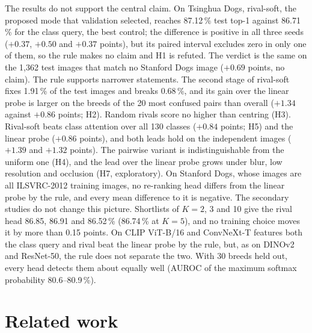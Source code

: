 \documentclass[11pt,a4paper]{article}
\theoremstyle{plain}
\begin{document}
The results do not support the central claim. On Tsinghua Dogs, rival-soft, the proposed mode that validation
selected, reaches 87.12\,\% test top-1 against 86.71\,\% for the class query, the best control; the difference is
positive in all three seeds ($+0.37$, $+0.50$ and $+0.37$ points), but its paired interval excludes zero in only
one of them, so the rule makes no claim and H1 is refuted. The verdict is the same on the 1,362 test images that
match no Stanford Dogs image ($+0.69$ points, no claim). The rule supports narrower statements. The second stage of
rival-soft fixes 1.91\,\% of the test images and breaks 0.68\,\%, and its gain over the linear probe is larger on
the breeds of the 20 most confused pairs than overall ($+1.34$ against $+0.86$ points; H2). Random rivals score no
higher than centring (H3). Rival-soft beats class attention over all 130 classes ($+0.84$ points; H5) and the linear
probe ($+0.86$ points), and both leads hold on the independent images ($+1.39$ and $+1.32$ points). The pairwise
variant is indistinguishable from the uniform one (H4), and the lead over the linear probe grows under blur, low
resolution and occlusion (H7, exploratory). On Stanford Dogs, whose images are all ILSVRC-2012 training images, no
re-ranking head differs from the linear probe by the rule, and every mean difference to it is negative.
The secondary studies do not change this picture. Shortlists of $K=2$, 3 and 10 give the rival head 86.85, 86.91 and
86.52\,\% (86.74\,\% at $K=5$), and no training choice moves it by more than 0.15 points. On CLIP ViT-B/16 and
ConvNeXt-T features both the class query and rival beat the linear probe by the rule, but, as on DINOv2 and ResNet-50,
the rule does not separate the two. With 30 breeds held out, every head detects them about equally well (AUROC of the
maximum softmax probability 80.6--80.9\,\%).

\section{Related work}\label{sec:related}
\end{document}
